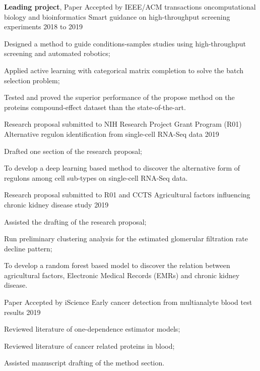 \begin{cventries}
  \cventry
    {\textbf{Leading project}, Paper Accepted by IEEE/ACM transactions oncomputational biology and bioinformatics} %
    {Smart guidance on high-throughput screening experiments} %
    {} %
    {2018 to 2019} %
    {
      \begin{cvitems} %
        \item Designed a method to guide conditions-samples studies using high-throughput screening and automated robotics;
        \item Applied active learning with categorical matrix completion to solve the batch selection problem;
        \item Tested and proved the superior performance of the propose method on the proteins compound-effect dataset than the state-of-the-art.
      \end{cvitems}
    }
    \cventry
    {Research proposal submitted to NIH Research Project Grant Program (R01)} %
    {Alternative regulon identification from single-cell RNA-Seq data} %
    {} %
    {2019} %
    {
      \begin{cvitems} %
        \item Drafted one section of the research proposal;
        \item To develop a deep learning based method to discover the alternative form of regulons among cell sub-types on single-cell RNA-Seq data.
      \end{cvitems}
    }
    
    
    \cventry
    {Research proposal submitted to R01 and CCTS} %
    {Agricultural factors influencing chronic kidney disease study} %
    {} %
    {2019} %
    {
      \begin{cvitems} %
        \item Assisted the drafting of the research proposal;
        \item Run preliminary clustering analysis for the estimated glomerular filtration rate decline pattern;
        \item To develop a random forest based model to discover the relation between agricultural factors, Electronic Medical Records (EMRs) and chronic kidney disease.
      \end{cvitems}
    }
    
    \cventry
    {Paper Accepted by iScience} %
    {Early cancer detection from multianalyte blood test results} %
    {} %
    {2019} %
    {
      \begin{cvitems} %
        \item Reviewed literature of one-dependence estimator models;
        \item Reviewed literature of cancer related proteins in blood;
        \item Assisted manuscript drafting of the method section.
      \end{cvitems}
    }
    

\end{cventries}
